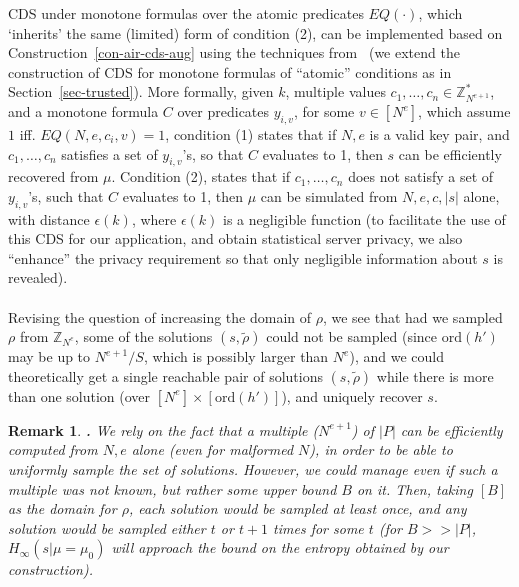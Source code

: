\documentclass{article}
\newcommand{\order}{{\mathrm{ord}}}
\newcommand{\size}[1]{|#1|}
\newcommand{\Z}{{\mathbb{Z}}}
\newtheorem{REMARK}{Remark}[section]
\newenvironment{remark}{\begin{REMARK} \hspace{-.85em} {\bf .} \rm}%
	{\end{REMARK}}
\newcommand{\opbrange}[3][,]{#2#1\ldots#1#3}
\newcommand{\U}[1]{\mathbb{Z}_{#1}^*}
\newcommand{\eps}{{\epsilon}}
\begin{document}
CDS under monotone formulas over the atomic predicates $EQ(\cdot)$, which `inherits' the same (limited) form of condition (2), can be implemented based on Construction~\ref{con-air-cds-aug} using the techniques from~\cite{AIR01,GIKM} (we extend the construction of CDS for monotone formulas of ``atomic'' 
conditions as in Section~\ref{sec-trusted}).
More formally, given $k$, multiple values $\opbrange{c_1}{c_n}\in\U{N^{e+1}}$, and a monotone formula $C$ over predicates $y_{i,v}$, for some $v\in[N^e]$, which assume $1$ iff. $EQ(N,e,c_i,v)=1$, condition (1) states that if $N,e$ is a valid key pair, and $\opbrange{c_1}{c_n}$ satisfies a set of $y_{i,v}$'s, so that $C$ evaluates to 1, then $s$ can be efficiently recovered from $\mu$. Condition (2), states that if $\opbrange{c_1}{c_n}$ does not satisfy a set of $y_{i,v}$'s, such that $C$ evaluates to 1, then $\mu$ can be simulated from $N,e,c,\size{s}$ alone, with distance $\eps(k)$, where $\eps(k)$ is a negligible function (to facilitate the use of this CDS
for our application, and obtain statistical server privacy, we also ``enhance'' the privacy requirement so that only negligible information about $s$ is revealed).
\paragraph{}Revising the question of increasing the domain of $\rho$, we see that had we sampled $\rho$ from $\Z_{N^e}$, some of the solutions $(s,\tilde{\rho})$ could not be sampled (since $\order(h')$ may be up to $N^{e+1}/S$, which is possibly larger than $N^e$), and we could theoretically get a single reachable pair of solutions $(s,\tilde{\rho})$ while there is more than one solution (over $[N^e]\times[\order(h')]$), and uniquely recover $s$.
\begin{remark}%
  We rely on the fact that a multiple ($N^{e+1}$) of $\size{P}$ can be efficiently
  computed from $N,e$ alone (even for malformed $N$), in order to be able to uniformly sample the set
  of solutions. However, we could manage even if such a multiple was not known, but rather some upper bound
  $B$ on it. Then, taking $[B]$ as the domain for $\rho$, each solution would be sampled at least once,
  and any solution would be sampled either $t$ or $t+1$ times for some $t$ (for $B>>\size{P}$, $H_{\infty}(s|\mu=\mu_0)$ will approach the bound on the entropy obtained by our construction).
\end{remark}
\end{document}
